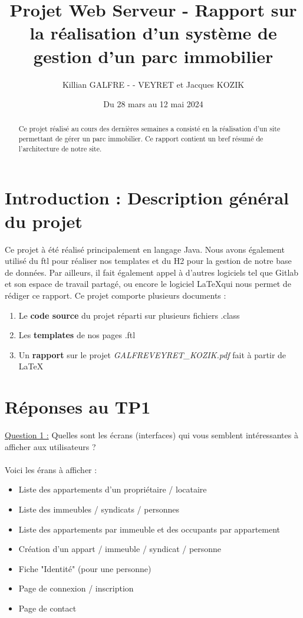 \documentclass[french]{article}
\title{Projet Web Serveur - Rapport sur la réalisation d'un système de gestion d'un parc immobilier}
\author{Killian GALFRE - - VEYRET et Jacques KOZIK}
\date{Du 28 mars au 12 mai 2024}
\begin{document}
\maketitle
\tableofcontents

\begin{abstract}
Ce projet réalisé au cours des dernières semaines a consisté en la réalisation d'un site permettant de gérer un parc immobilier. Ce rapport contient un bref résumé de l'architecture de notre site.
\end{abstract}

\section{Introduction : Description général du projet}
Ce projet à été réalisé principalement en langage Java. Nous avons également utilisé du ftl pour réaliser nos templates et du H2 pour la gestion de notre base de données. Par ailleurs, il fait également appel à d'autres logiciels tel que Gitlab et son espace de travail partagé, ou encore le logiciel \LaTeX \space qui nous permet de rédiger ce rapport. Ce projet comporte plusieurs documents :
\begin{enumerate}
\item Le \textbf{code source} du projet réparti sur plusieurs fichiers .class
\item Les \textbf{templates} de nos pages .ftl
\item Un \textbf{rapport} sur le projet \textit{GALFREVEYRET\_KOZIK.pdf} fait à partir de \LaTeX \\
\end{enumerate}

\section{Réponses au TP1}
\underline{Question 1 :} Quelles sont les écrans (interfaces) qui vous semblent intéressantes à afficher aux utilisateurs ? \\ \\
Voici les érans à afficher :
\begin{itemize}
\item Liste des appartements d'un propriétaire / locataire
\item Liste des immeubles / syndicats / personnes
\item Liste des appartements par immeuble et des occupants par appartement
\item Création d'un appart / immeuble / syndicat / personne
\item Fiche "Identité" (pour une personne)
\item Page de connexion / inscription
\item Page de contact \\
\end{itemize}
\end{document}

